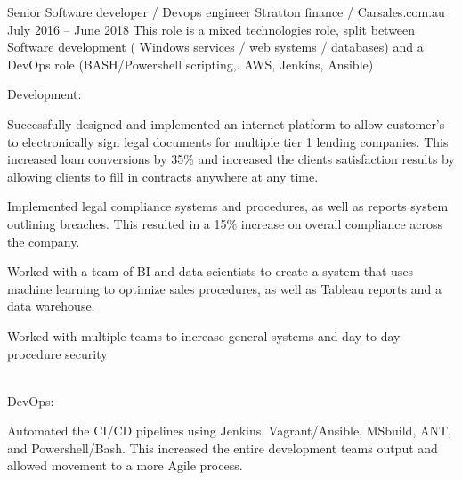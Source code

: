 \begin{cventries}
  \cventryextended
  {Senior Software developer / Devops engineer} %
  {Stratton finance / Carsales.com.au} %
  {} %
  {July 2016 – June 2018} %
  {This role is a mixed technologies role,  split between Software development ( Windows services / web systems /
    databases) and a DevOps role (BASH/Powershell scripting,. AWS, Jenkins, Ansible) }
  {
    \begin{cvitems} %
      \item{Development:
                  \\
                  \begin{cvitems}
                    \item {Successfully designed and implemented an internet platform to allow customer’s to
                                electronically sign legal documents for
                                multiple tier 1 lending companies. This increased loan conversions by 35\% and
                                increased the
                                clients satisfaction results by allowing clients to fill in contracts anywhere at any
                                time.}
                    \item {Implemented legal compliance systems and procedures, as well as reports system outlining
                                breaches. This resulted in a 15\% increase on overall compliance across the company.}
                    \item {Worked with a team of BI and data scientists to create a system that uses machine learning
                                to optimize sales procedures, as well as Tableau reports and a data warehouse. }
                    \item {Worked with multiple teams to increase general systems and day to day procedure security
                                \\\\}
                  \end{cvitems}
            }
      \item{DevOps:
                  \\
                  \begin{cvitems}
                    \item {Automated the CI/CD pipelines using Jenkins, Vagrant/Ansible, MSbuild, ANT, and Powershell/Bash.
                                This increased the entire development teams output and allowed movement to a more Agile process.}

\end{cvitems}}
\end{cvitems}}
\end{cventries}
